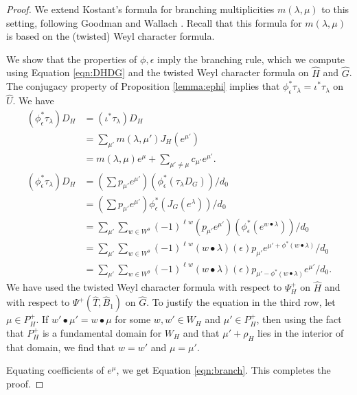 \begin{proof}
  We extend Kostant's formula for branching multiplicities
  $m(\lambda,\mu)$ to this setting, following Goodman and Wallach
  \cite[\S8.2.2]{goodman}.  Recall that this formula for
  $m(\lambda,\mu)$ is based on the (twisted) Weyl character formula.

  We show that the properties of $\phi,\epsilon$ imply the branching
  rule, which we compute using Equation \ref{eqn:DHDG} and the twisted
  Weyl character formula on $\hat H$ and $\hat G$.  The conjugacy
  property of Proposition \ref{lemma:ephi} implies that
  $\phi_\epsilon^*\tau_\lambda = \iota^*\tau_\lambda$ on $\hat U$.  We
  have
\begin{align*}
(\phi^*_\epsilon\tau_\lambda) D_H 
 &= (\iota^*\tau_\lambda) D_H\\
 &= \sum_{\mu'} m(\lambda,{\mu'}) J_H(e^{\mu'})\\
  &= m(\lambda,\mu)e^\mu + \sum_{\mu'\ne\mu} c_{\mu'} e^{\mu'}.\\
(\phi^*_\epsilon\tau_\lambda) D_H 
  &= (\sum p_{\mu'} e^{\mu'})(\phi^*_\epsilon(\tau_\lambda D_{G})) /d_0\\
  &= (\sum p_{\mu'} e^{\mu'}) \phi^*_\epsilon(J_G(e^\lambda)) /d_0\\
  &= \sum_{\mu'} \sum_{w\in W^\theta} (-1)^{\ell w} 
  (p_{\mu'} e^{\mu'}) (\phi^*_\epsilon (e^{w\bullet \lambda})) /d_0\\
  &= \sum_{\mu'} \sum_{w\in W^\theta} (-1)^{\ell w}  
 ({w\bullet\lambda})(\epsilon) p_{\mu'}
e^{\mu'+\phi^*(w\bullet \lambda)} /d_0\\
  &= \sum_{\mu'} \sum_{w\in W^\theta} 
(-1)^{\ell w} ({w\bullet\lambda})(\epsilon) 
 p_{\mu' - \phi^*({w\bullet \lambda})} e^{\mu'} /d_0.
\end{align*}
We have used the twisted Weyl character formula with respect to $\Psi^+_H$ on $\hat H$
and with respect to $\Psi^+(\hat T,\hat B_1)$  on $\hat G$.
To justify the equation in the third row, let $\mu\in P_H^+$.  If
$w'\bullet \mu' = w\bullet \mu$ for some $w,w'\in W_H$ and $\mu'\in
P_H^+$, then using the fact that $P_H^+$ is a fundamental domain for
$W_H$ and that $\mu'+\rho_H$ lies in the interior of that domain, we
find that $w=w'$ and $\mu=\mu'$.

Equating coefficients of $e^\mu$, we get Equation \ref{eqn:branch}.
This completes the proof.
\end{proof}



